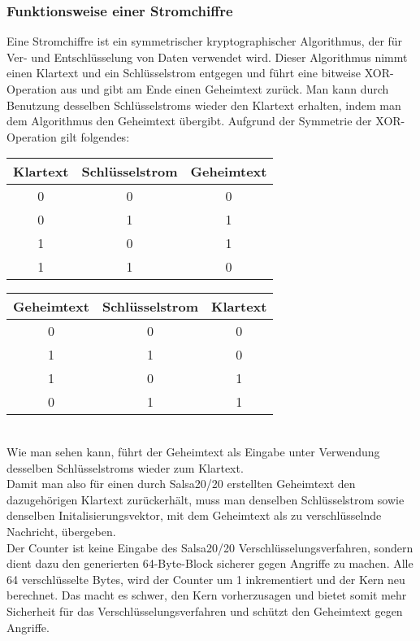 \documentclass[course=erap]{aspdoc}
\begin{document}
\subsubsection{Funktionsweise einer Stromchiffre}
Eine Stromchiffre ist ein symmetrischer kryptographischer Algorithmus, der für Ver- und Entschlüsselung von Daten verwendet wird.
Dieser Algorithmus nimmt einen Klartext und ein Schlüsselstrom entgegen und führt eine bitweise XOR-Operation aus und gibt am Ende
einen Geheimtext zurück.
Man kann durch Benutzung desselben Schlüsselstroms wieder den Klartext erhalten, indem man dem Algorithmus den Geheimtext übergibt.
Aufgrund der Symmetrie der XOR-Operation gilt folgendes:
\begin{table}[!h]
    \begin{tabular}{|c|c|c|}
        \hline
        Klartext & Schlüsselstrom & Geheimtext \\
        \hline
        0        & 0              & 0          \\
        0        & 1              & 1          \\
        1        & 0              & 1          \\
        1        & 1              & 0          \\
        \hline
    \end{tabular}
    \begin{tabular}{|c|c|c|}
        \hline
        Geheimtext & Schlüsselstrom & Klartext \\
        \hline
        0          & 0              & 0        \\
        1          & 1              & 0        \\
        1          & 0              & 1        \\
        0          & 1              & 1        \\
        \hline
    \end{tabular}
\end{table}
\\
Wie man sehen kann, führt der Geheimtext als Eingabe unter Verwendung desselben Schlüsselstroms wieder zum Klartext.
\vspace{3mm}
\\
Damit man also für einen durch Salsa20/20 erstellten Geheimtext den dazugehörigen Klartext zurückerhält,
muss man denselben Schlüsselstrom sowie denselben Initalisierungsvektor, mit dem Geheimtext als zu verschlüsselnde Nachricht, übergeben.
\\
Der Counter ist keine Eingabe des Salsa20/20 Verschlüsselungsverfahren, sondern dient dazu den generierten 64-Byte-Block sicherer gegen Angriffe zu machen. Alle 64 verschlüsselte Bytes, wird der Counter um 1 inkrementiert und der Kern neu berechnet. Das macht es schwer, den Kern vorherzusagen und bietet somit mehr Sicherheit für das Verschlüsselungsverfahren und schützt den Geheimtext gegen Angriffe.
\end{document}
